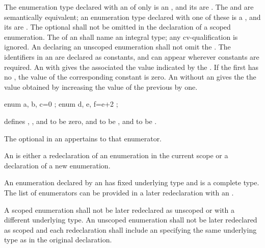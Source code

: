 \pnum
{}%
%
The enumeration type declared with an 
of only  is an ,
and its  are .
The   and
 are semantically equivalent; an enumeration
type declared with one of these is a ,
and its  are .
The optional  shall not be omitted in the declaration of a scoped enumeration.
The  of an 
shall name an integral type; any cv-qualification is ignored.
An  declaring an unscoped enumeration shall
not omit the .
The identifiers in an  are declared as
constants, and can appear wherever constants are required.
%
An  with \tcode{=} gives the associated
 the value indicated by the
.
If the first 
has no , the value of the corresponding constant
is zero. An  without an
 gives the  the value
obtained by increasing the value of the previous 
by one.
\begin{example}

\begin{codeblock}
enum { a, b, c=0 };
enum { d, e, f=e+2 };
\end{codeblock}

defines , , and  to be zero,  and
 to be , and  to be .
\end{example}
The optional  in an
 appertains to that enumerator.

\pnum
An  is either a redeclaration
of an enumeration in the current scope or a declaration of a new enumeration.
\begin{note} An enumeration declared by an
 has fixed underlying type and is a
complete type. The list of enumerators can be provided in a later redeclaration
with an . \end{note} A scoped enumeration
shall not be later redeclared as unscoped or with a different underlying type.
An unscoped enumeration shall not be later redeclared as scoped and each
redeclaration shall include an  specifying the same
underlying type as in the original declaration.

